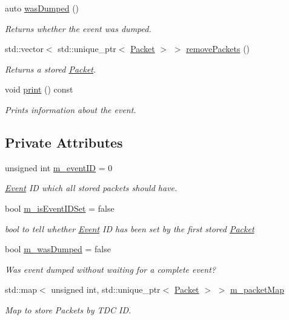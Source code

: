 \begin{DoxyCompactItemize}
auto \hyperlink{class_event_a51ba784cf88a5f581d426e9a8c6f4764}{was\+Dumped} ()
\begin{DoxyCompactList}\small\item\em Returns whether the event was dumped. \end{DoxyCompactList}\item 
std\+::vector$<$ std\+::unique\+\_\+ptr$<$ \hyperlink{class_packet}{Packet} $>$ $>$ \hyperlink{class_event_a4a7c0f87ea9fd8526451d6eddc3a592e}{remove\+Packets} ()
\begin{DoxyCompactList}\small\item\em Returns a stored \hyperlink{class_packet}{Packet}. \end{DoxyCompactList}\item 
void \hyperlink{class_event_ab1b48a39a41a7fc92a25617adcf68aa8}{print} () const
\begin{DoxyCompactList}\small\item\em Prints information about the event. \end{DoxyCompactList}\end{DoxyCompactItemize}
\subsection*{Private Attributes}
\begin{DoxyCompactItemize}
\item 
unsigned int \hyperlink{class_event_af0c352ab6a128f9df56b231d941aff25}{m\+\_\+event\+ID} = 0
\begin{DoxyCompactList}\small\item\em \hyperlink{class_event}{Event} ID which all stored packets should have. \end{DoxyCompactList}\item 
bool \hyperlink{class_event_a3b435b2fe840647c01ae0ee838b66a54}{m\+\_\+is\+Event\+I\+D\+Set} = false
\begin{DoxyCompactList}\small\item\em bool to tell whether \hyperlink{class_event}{Event} ID has been set by the first stored \hyperlink{class_packet}{Packet} \end{DoxyCompactList}\item 
bool \hyperlink{class_event_adf297e8a9a7f7e7496dbb2e1ea61c893}{m\+\_\+was\+Dumped} = false
\begin{DoxyCompactList}\small\item\em Was event dumped without waiting for a complete event? \end{DoxyCompactList}\item 
std\+::map$<$ unsigned int, std\+::unique\+\_\+ptr$<$ \hyperlink{class_packet}{Packet} $>$ $>$ \hyperlink{class_event_a6aabddb7af6189a884d8eacd582bc10f}{m\+\_\+packet\+Map}
\begin{DoxyCompactList}\small\item\em Map to store Packets by T\+DC ID. \end{DoxyCompactList}\end{DoxyCompactItemize}


